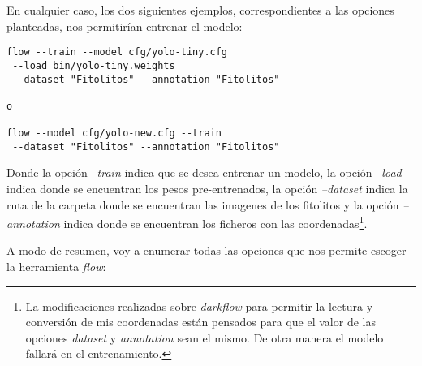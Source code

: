 En cualquier caso, los dos siguientes ejemplos, correspondientes a las opciones planteadas, nos permitirían entrenar el modelo:

\begin{verbatim}
flow --train --model cfg/yolo-tiny.cfg
 --load bin/yolo-tiny.weights
 --dataset "Fitolitos" --annotation "Fitolitos"

o

flow --model cfg/yolo-new.cfg --train
 --dataset "Fitolitos" --annotation "Fitolitos"
\end{verbatim}

Donde la opción \textit{--train} indica que se desea entrenar un modelo, la opción \textit{--load} indica donde se encuentran los pesos pre-entrenados, la opción \textit{--dataset} indica la ruta de la carpeta donde se encuentran las imagenes de los fitolitos y la opción \textit{--annotation} indica donde se encuentran los ficheros con las coordenadas\footnote{La modificaciones realizadas sobre \href{https://github.com/thtrieu/darkflow}{\textit{darkflow}} para permitir la lectura y conversión de mis coordenadas están pensados para que el valor de las opciones \textit{dataset} y \textit{annotation} sean el mismo. De otra manera el modelo fallará en el entrenamiento.}.

A modo de resumen, voy a enumerar todas las opciones que nos permite escoger la herramienta \textit{flow}:


